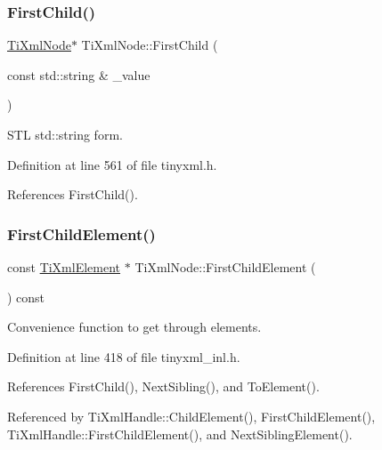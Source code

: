 \subsubsection{\texorpdfstring{First\+Child()}{FirstChild()}\hspace{0.1cm}{\footnotesize\ttfamily [6/6]}}
{\footnotesize\ttfamily \hyperlink{class_ti_xml_node}{Ti\+Xml\+Node}$\ast$ Ti\+Xml\+Node\+::\+First\+Child (\begin{DoxyParamCaption}\item[{const std\+::string \&}]{\+\_\+value }\end{DoxyParamCaption})\hspace{0.3cm}{\ttfamily [inline]}}



S\+TL std\+::string form. 



Definition at line 561 of file tinyxml.\+h.



References First\+Child().

\hypertarget{class_ti_xml_node_a12c973e1da9e90a178924b8ea5a5f4d1}{}\label{class_ti_xml_node_a12c973e1da9e90a178924b8ea5a5f4d1} 
\subsubsection{\texorpdfstring{First\+Child\+Element()}{FirstChildElement()}\hspace{0.1cm}{\footnotesize\ttfamily [1/6]}}
{\footnotesize\ttfamily const \hyperlink{class_ti_xml_element}{Ti\+Xml\+Element} $\ast$ Ti\+Xml\+Node\+::\+First\+Child\+Element (\begin{DoxyParamCaption}{ }\end{DoxyParamCaption}) const}



Convenience function to get through elements. 



Definition at line 418 of file tinyxml\+\_\+inl.\+h.



References First\+Child(), Next\+Sibling(), and To\+Element().



Referenced by Ti\+Xml\+Handle\+::\+Child\+Element(), First\+Child\+Element(), Ti\+Xml\+Handle\+::\+First\+Child\+Element(), and Next\+Sibling\+Element().

